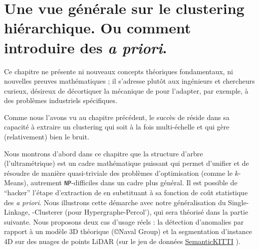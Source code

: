 
\chapter{Une vue générale sur le clustering hiérarchique. Ou comment introduire des \emph{a priori}. %
}
\label{chap:hacker_hdbscan}


Ce chapitre ne présente ni nouveaux concepts théoriques fondamentaux, ni nouvelles preuves mathématiques ; il s'adresse plutôt aux ingénieurs et chercheurs curieux, désireux de décortiquer la mécanique de \HDBSCAN pour l'adapter, par exemple, à des problèmes industriels spécifiques.

Comme nous l'avons vu au chapitre précédent, le succès de \HDBSCAN réside dans sa capacité à extraire un clustering qui soit à la fois multi-échelle et qui gère (relativement) bien le bruit.

Nous montrons d'abord dans ce chapitre que la structure d'arbre (l'ultramétrique) est un cadre mathématique puissant qui permet d'unifier et de résoudre de manière quasi-triviale des problèmes d'optimisation (comme le $k$-Means), autrement \texttt{NP}-difficiles dans un cadre plus général. 
Il est possible de ``hacker'' l'étape d'extraction de \HDBSCAN en substituant à sa fonction de coût statistique des \emph{a priori}. 
Nous illustrons cette démarche avec notre généralisation du Single-Linkage, {\HGP-Clusterer} (\HGP pour Hypergraphe-Percol'), qui sera théorisé dans la partie suivante. Nous proposons deux cas d'usage réels : la détection d'anomalies par rapport à un modèle 3D théorique (\copyright Naval Group) et la segmentation d'instance 4D sur des nuages de points LiDAR (sur le jeu de données \href{https://semantic-kitti.org/}{SemanticKITTI} \cite{SemanticKITTI}).



